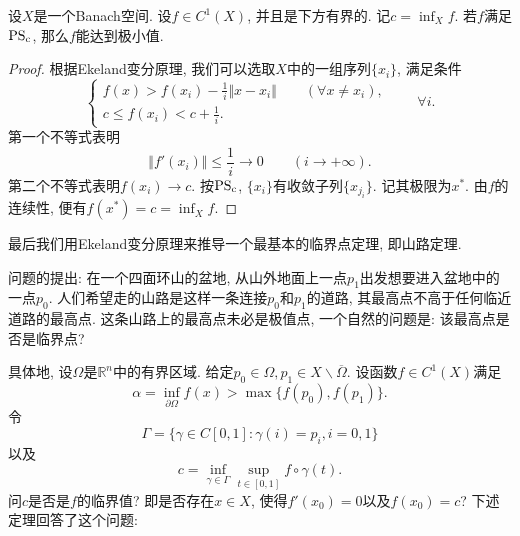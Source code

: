 \begin{corollary}
    设$X$是一个Banach空间. 设$f \in C^1(X)$, 并且是下方有界的. 记$c = \inf_Xf$.
    若$f$满足${\rm PS_c}$, 那么$f$能达到极小值.
    \begin{proof}
        根据Ekeland变分原理, 我们可以选取$X$中的一组序列$\{x_i\}$, 满足条件 
        \begin{equation*}
            \begin{cases}
                \displaystyle f(x) > f(x_i) - \frac{1}{i}\Vert x - x_i\Vert \qquad (\forall x \neq x_i), \\ 
                \displaystyle c \leq f(x_i) < c + \frac{1}{i}.
            \end{cases}
            \qquad \forall i.
        \end{equation*}
        第一个不等式表明 
        \begin{equation*}
            \Vert f'(x_i) \Vert \leq \frac{1}{i} \rightarrow 0 \qquad (i \rightarrow +\infty).
        \end{equation*}
        第二个不等式表明$f(x_i) \rightarrow c$. 按${\rm PS_c}$, $\{x_i\}$有收敛子列$\{x_{j_i}\}$.
        记其极限为$x^*$. 由$f$的连续性, 便有$f(x^*) = c = \inf_Xf$.
    \end{proof}
\end{corollary}

最后我们用Ekeland变分原理来推导一个最基本的临界点定理, 即山路定理.

问题的提出: 在一个四面环山的盆地, 从山外地面上一点$p_1$出发想要进入盆地中的一点$p_0$.
人们希望走的山路是这样一条连接$p_0$和$p_1$的道路, 其最高点不高于任何临近道路的最高点.
这条山路上的最高点未必是极值点, 一个自然的问题是: 该最高点是否是临界点?

具体地, 设$\Omega$是$\mathbb{R}^n$中的有界区域. 给定$p_0 \in \Omega, p_1 \in X \smallsetminus \overline{\Omega}$.
设函数$f \in C^1(X)$满足 
\begin{equation}\label{51}
    \alpha = \inf_{\partial\Omega}f(x) > \max\{f(p_0), f(p_1)\}.
\end{equation}
令 
\begin{equation}\label{52}
    \Gamma = \{\gamma \in C[0, 1]\colon \gamma(i) = p_i, i = 0, 1\}
\end{equation}
以及 
\begin{equation}\label{53}
    c = \inf_{\gamma \in \Gamma}\sup_{t \in [0, 1]}f \circ \gamma(t).
\end{equation}
问$c$是否是$f$的临界值? 即是否存在$x \in X$, 使得$f'(x_0) = 0$以及$f(x_0) = c$?
下述定理回答了这个问题:

